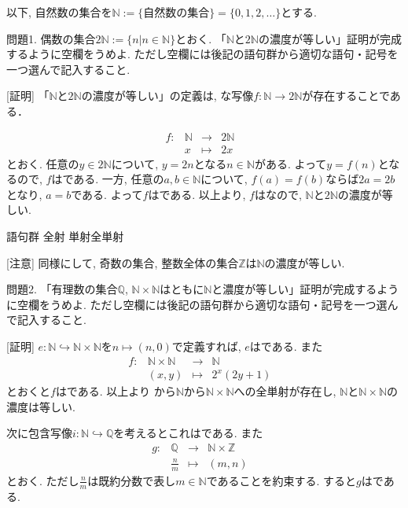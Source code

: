 \documentclass[dvipdfmx,a4paper,11pt]{article}
\newcommand{\Z}{\mathbb{Z}}
\newcommand{\Q}{\mathbb{Q}}
\newcommand{\N}{\mathbb{N}}
\theoremstyle{definition}
\begin{document}
以下, 自然数の集合を$\N:= \{ \text{自然数の集合}\} = \{ 0,1,2,\ldots\}$とする. 

問題1. 偶数の集合$2\N := \{ n | n \in \N \}$とおく. 「$\N$と$2\N$の濃度が等しい」証明が完成するように空欄をうめよ. 
ただし空欄には後記の語句群から適切な語句・記号を一つ選んで記入すること.

[証明]
「$\N$と$2\N$の濃度が等しい」の定義は, \boxed{\phantom{hogehoge}}な写像$f : \N \to 2\N$が存在することである．

  $$
\begin{array}{ccccc}
f: &\N& \rightarrow & 2\N& \\
&x& \longmapsto & 
2x
 &
\end{array}
$$
とおく.
任意の$y \in 2\N$について, $y=2n$となる$n \in \N$がある. よって$y=f(n)$となるので, $f$は\boxed{\phantom{hogehoge}}である.
一方, 任意の$a,b \in \N$について, $f(a)=f(b)$ならば$2a=2b$となり, $a=b$である. よって$f$は\boxed{\phantom{hogehoge}}である. 
以上より, $f$は\boxed{\phantom{hogehoge}}なので, $\N$と$2\N$の濃度が等しい.

\begin{itembox}[l]{語句群}
全射 \quad 単射\quad 全単射 
\end{itembox}

[注意] 同様にして, 奇数の集合, 整数全体の集合$\Z$は$\N$の濃度が等しい. 

\newpage
問題2. 「有理数の集合$\Q$, $\N \times \N$はともに$\N$と濃度が等しい」証明が完成するように空欄をうめよ. 
ただし空欄には後記の語句群から適切な語句・記号を一つ選んで記入すること.

[証明]
$e: \N \hookrightarrow \N \times \N$を$n \mapsto (n,0)$で定義すれば, $e$は\boxed{\phantom{hogehoge}}である.
また
  $$
\begin{array}{ccccc}
f: &\N \times \N& \rightarrow & \N& \\
&(x, y)& \longmapsto & 
2^{x}(2y+1)
 &
\end{array}
$$
とおくと$f$は\boxed{\phantom{hogehoge}}である. 以上より\boxed{\phantom{hogehoge}}
から$\N$から$\N \times \N$への全単射が存在し, $\N$と$\N \times \N$の濃度は等しい. 

次に包含写像$i : \N \hookrightarrow \Q$を考えるとこれは\boxed{\phantom{hogehoge}}である. 
また
  $$
\begin{array}{ccccc}
g: &\Q& \rightarrow & \N \times \Z& \\
&\frac{n}{m}& \longmapsto & 
(m,n)
 &
\end{array}
$$
とおく. ただし$\frac{n}{m}$は既約分数で表し$m \in \N$であることを約束する. 
すると$g$は\boxed{\phantom{hogehoge}}である.
\end{document}
